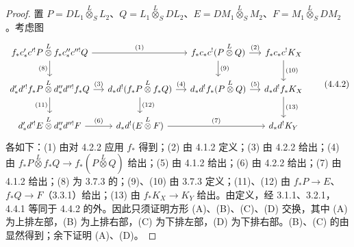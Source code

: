\begin{proof}
置 $P=DL_1\mathbin{\overset L\otimes}_SL_2$、$Q=L_1\mathbin{\overset L\otimes}_SDL_2$、$E=DM_1\mathbin{\overset L\otimes}_SM_2$、$F=M_1\mathbin{\overset L\otimes}_SDM_2$。考虑图
\[\begin{tikzcd}[column sep=small]
f_*c'_*c'^!P\mathbin{\overset L\otimes}f_*c''_*c''^!Q\arrow[rr,"(1)"]\arrow[d,"(8)"']&&f_*c_*c^!(P\mathbin{\overset L\otimes}Q)\arrow[r,"(2)"]\arrow[d,"(9)"]&f_*c_*c^!K_X\arrow[d,"(10)"]\\
d'_*d'^!f_*P\mathbin{\overset L\otimes}d''_*d''^!f_*Q\arrow[r,"(3)"]\arrow[d,"(11)"']&d_*d^!(f_*P\mathbin{\overset L\otimes}f_*Q)\arrow[r,"(4)"]\arrow[d,"(12)"]&d_*d^!f_*(P\mathbin{\overset L\otimes}Q)\arrow[r,"(5)"]&d_*d^!f_*K_X\arrow[d,"(13)"]\\
d'_*d'^!E\mathbin{\overset L\otimes}d''_*d''^!F\arrow[r,"(6)"]&d_*d^!(E\mathbin{\overset L\otimes}F)\arrow[rr,"(7)"]&&d_*d^!K_Y
\end{tikzcd}\tag{4.4.2}\]
各如下：(1) 由对 4.2.2 应用 $f_*$ 得到；(2) 由 4.1.2 定义；(3) 由 4.2.2 给出；(4) 由 $f_*P\mathbin{\overset L\otimes}f_*Q\to f_*(P\mathbin{\overset L\otimes}Q)$ 给出；(5) 由 4.1.2 给出；(6) 由 4.2.2 给出；(7) 由 4.1.2 给出；(8) 为 3.7.3 的；(9)、(10) 由 3.7.3 定义；(11)、(12) 由 $f_*P\to E$、$f_*Q\to F$（3.3.1）给出；(13) 由 $f_*K_X\to K_Y$ 给出。由定义，经 3.1.1、3.2.1，4.4.1 等同于 4.4.2 的外。因此只须证明方形 (A)、(B)、(C)、(D) 交换，其中 (A) 为上排左部，(B) 为上排右部，(C) 为下排左部，(D) 为下排右部。(B)、(C) 的由显然得到；余下证明 (A)、(D)。


\end{proof}
